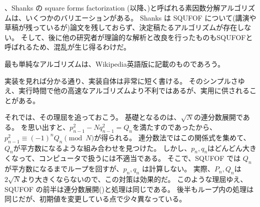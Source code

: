 、Shanks の square forms factorization (以降、)と呼ばれる素因数分解アルゴリズムは、いくつかのバリエーションがある。
Shanks は SQUFOF について(講演や草稿が残っているが)論文を残しておらず、決定稿たるアルゴリズムが存在しない。
そして、後に他の研究者が理論的な解析と改良を行ったものもSQUFOFと呼ばれるため、混乱が生じ得るわけだ。

最も単純なアルゴリズムは、Wikipedia英語版\cite{wiki:Shanks's_square_forms_factorization}に記載のものであろう。


実装を見れば分かる通り、実装自体は非常に短く書ける。
そのシンプルさゆえ、実行時間で他の高速なアルゴリズムより不利ではあるが、実用に供されることがある。

それでは、その理屈を追っておこう。
基礎となるのは、$\sqrt{N}$の連分数展開である。
を思い出すと、$p_{n-1}^2 - N q_{n-1}^2 = Q_n$を満たすのであったから、$p_{n-1}^2 \equiv (-1)^n Q_n \pmod{N}$が得られる。
連分数法ではこの関係式を集めて、$Q_n$が平方数になるような組み合わせを見つけた。
しかし、$p_n,q_n$はどんどん大きくなって、コンピュータで扱うには不適当である。
そこで、SQUFOF では $Q_n$ が平方数になるまでループを回すが、$p_n,q_n$ は計算しない。
実際、$P_n,Q_n$は$2\sqrt{N}$より大きくならないので、この対策は効果的だ。
このような理屈ゆえ、SQUFOF の前半は連分数展開()と処理は同じである。
後半もループ内の処理は同じだが、初期値を変更している点で少々異なっている。

